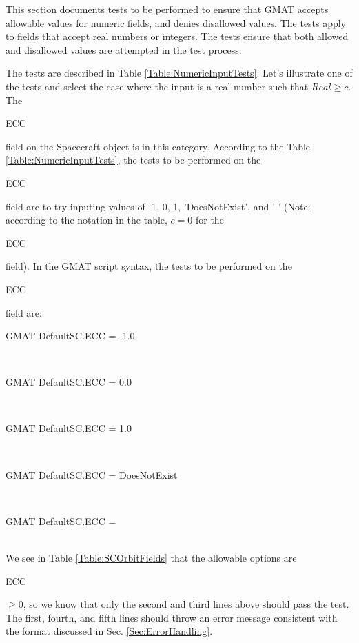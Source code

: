 \documentclass[10 pt]{book}
\newcommand{\st}[1]{\begin{ttfamily}#1\end{ttfamily}}
\begin{document}
This section documents tests to be performed to ensure that GMAT
accepts allowable values for numeric fields, and denies disallowed
values.  The tests apply to fields that accept real numbers or
integers.  The tests ensure that both allowed and disallowed values
are attempted in the test process.

The tests are described in Table \ref{Table:NumericInputTests}.
Let's illustrate one of the tests and select the case where the
input is a real number such that  $Real \geq c$.  The \st{ECC} field
on the Spacecraft object is in this category.  According to the
Table \ref{Table:NumericInputTests}, the tests to be performed on
the \st{ECC} field are to try inputing values of -1, 0, 1,
'DoesNotExist', and ' ' (Note: according to the notation in the table, $c=0$
for the \st{ECC} field). In the GMAT script syntax, the tests to be
performed on the \st{ECC} field are:\\

\noindent \st{GMAT DefaultSC.ECC = -1.0} \\
\st{GMAT DefaultSC.ECC =  0.0} \\
\st{GMAT DefaultSC.ECC =  1.0} \\
\st{GMAT DefaultSC.ECC =  DoesNotExist} \\
\st{GMAT DefaultSC.ECC =  } \\

We see in Table \ref{Table:SCOrbitFields} that the allowable options
are \st{ECC}$\geq 0$, so we know that only the second and third
lines above should pass the test. The first, fourth, and fifth lines should
throw an error message consistent with the format discussed in Sec.
\ref{Sec:ErrorHandling}.
\end{document}
